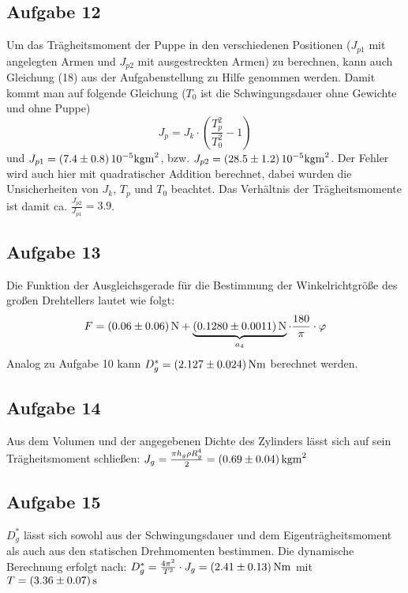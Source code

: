 \documentclass[a4paper, 11pt, ngerman]{scrartcl}
\begin{document}
\subsection{Aufgabe 12}\label{sub:A12}
Um das Trägheitsmoment der Puppe in den verschiedenen Positionen ($J_{p1}$ mit angelegten Armen und $J_{p2}$ mit ausgestreckten Armen) zu berechnen, kann auch Gleichung (18) aus der Aufgabenstellung zu Hilfe genommen werden. Damit kommt man auf folgende Gleichung ($T_0$ ist die Schwingungsdauer ohne Gewichte und ohne Puppe)
\begin{equation}\label{equ:TraegheitsmomentPuppe}
J_p = J_k \cdot \left(\frac{T_p^2}{T_0^2} - 1\right)
\end{equation}
und $J_{p1} = \SI{7.4 \pm 0.8}{10^{-5}kgm^2}$, bzw. $J_{p2} = \SI{28.5 \pm 1.2}{10^{-5}kgm^2}$. Der Fehler wird auch hier mit quadratischer Addition berechnet, dabei wurden die Unsicherheiten von $J_k$, $T_p$ und $T_0$ beachtet. Das Verhältnis der Trägheitsmomente ist damit ca. $\frac{J_{p2}}{J_{p1}} = 3.9$.

\subsection{Aufgabe 13}

Die Funktion der Ausgleichsgerade für die Bestimmung der Winkelrichtgröße des großen Drehtellers lautet wie folgt:
\begin{equation}
F = \SI{0.06 \pm 0.06}{N} + \underbrace{\SI{0.1280 \pm 0.0011}{N}}_{a_4} \cdot \frac{180}{\pi} \cdot \varphi
\end{equation}
Analog zu Aufgabe 10 kann $D^*_g = \SI{2.127 \pm 0.024}{Nm}$ berechnet werden.

\subsection{Aufgabe 14}
Aus dem Volumen und der angegebenen Dichte des Zylinders lässt sich auf sein Trägheitsmoment schließen: $J_g = \frac{\pi h_g \rho R_g^4}{2} = \SI{0.69 \pm 0.04}{kgm^2}$

\subsection{Aufgabe 15}
$D^*_g$ lässt sich sowohl aus der Schwingungsdauer und dem Eigenträgheitsmoment als auch aus den statischen Drehmomenten bestimmen. Die dynamische Berechnung erfolgt nach: $D^*_g = \frac{4\pi^2}{T^2} \cdot J_g = \SI{2.41 \pm 0.13}{Nm}$ mit $T = \SI{3.36 \pm 0.07}{s}$
\end{document}
